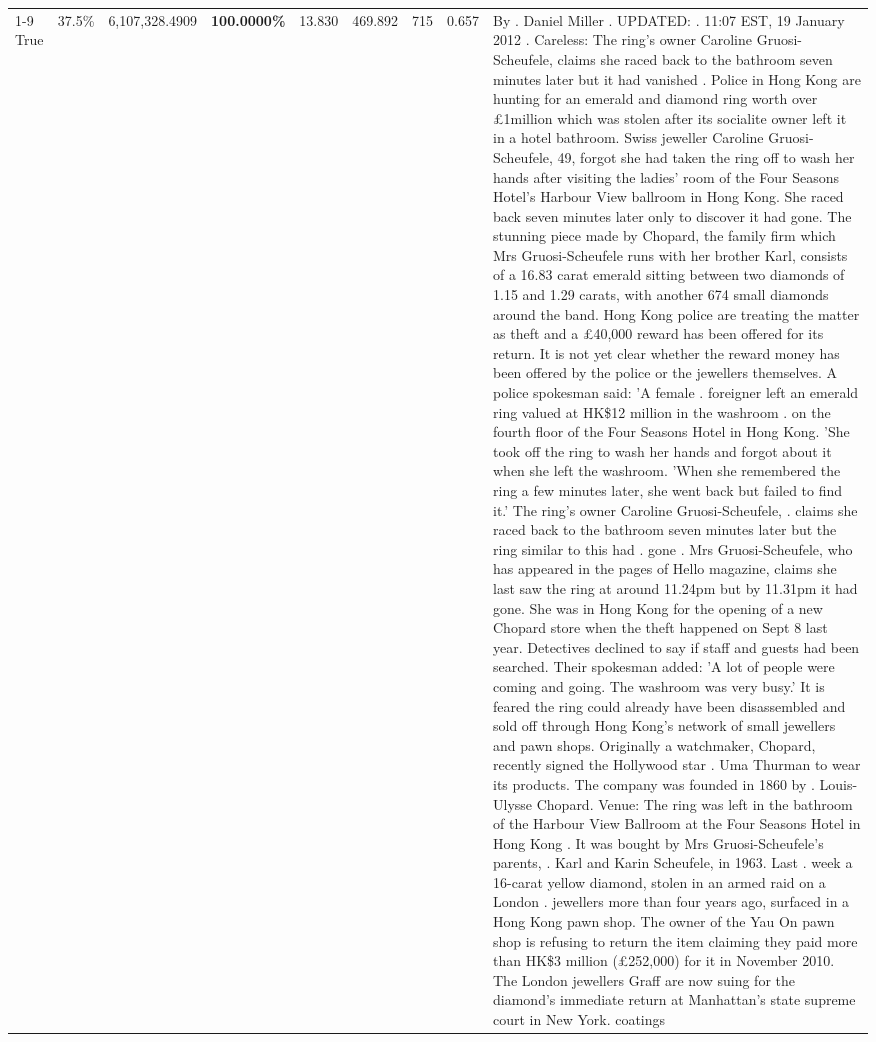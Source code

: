\begin{table}[H]
\begin{tabular}{lllrlllll}
\cline{1-9}
True & 37.5\% & 6,107,328.4909 & \bfseries \color{red} 100.0000\% & 13.830 & 469.892 & 715 & 0.657 & By . Daniel Miller . UPDATED: . 11:07 EST, 19 January 2012 . Careless: The ring's owner Caroline Gruosi-Scheufele, claims she raced back to the bathroom seven minutes later but it had vanished . Police in Hong Kong are hunting for an emerald and diamond ring worth over £1million which was stolen after its socialite owner left it in a hotel bathroom. Swiss jeweller Caroline Gruosi-Scheufele, 49, forgot she had taken the ring off to wash her hands after visiting the ladies' room of the Four Seasons Hotel's Harbour View ballroom in Hong Kong. She raced back seven minutes later only to discover it had gone. The stunning piece made by Chopard, the family firm which Mrs Gruosi-Scheufele runs with her brother Karl, consists of a 16.83 carat emerald sitting between two diamonds of 1.15 and 1.29 carats, with another 674 small diamonds around the band. Hong Kong police are treating the matter as theft and a £40,000 reward has been offered for its return. It is not yet clear whether the reward money has been offered by the police or the jewellers themselves. A police spokesman said: 'A female . foreigner left an emerald ring valued at HK\$12 million in the washroom . on the fourth floor of the Four Seasons Hotel in Hong Kong. 'She took off the ring to wash her hands and forgot about it when she left the washroom. 'When she remembered the ring a few minutes later, she went back but failed to find it.' The ring's owner Caroline Gruosi-Scheufele, . claims she raced back to the bathroom seven minutes later but the ring similar to this had . gone . Mrs Gruosi-Scheufele, who has appeared in the pages of Hello magazine, claims she last saw the ring at around 11.24pm but by 11.31pm it had gone. She was in Hong Kong for the opening of a new Chopard store when the theft happened on Sept 8 last year. Detectives declined to say if staff and guests had been searched. Their spokesman added: 'A lot of people were coming and going. The washroom was very busy.' It is feared the ring could already have been disassembled and sold off through Hong Kong's network of small jewellers and pawn shops. Originally a watchmaker, Chopard, recently signed the Hollywood star . Uma Thurman to wear its products. The company was founded in 1860 by . Louis-Ulysse Chopard. Venue: The ring was left in the bathroom of the Harbour View Ballroom at the Four Seasons Hotel in Hong Kong . It was bought by Mrs Gruosi-Scheufele's  parents, . Karl and Karin Scheufele, in 1963. Last . week a 16-carat yellow diamond, stolen in an armed raid on a London . jewellers more than four years ago, surfaced in a Hong Kong pawn shop. The owner of the Yau On pawn shop is refusing to return the item claiming they paid more than HK\$3 million (£252,000) for it in November 2010. The London jewellers Graff are now suing for the diamond’s immediate return at Manhattan’s state supreme court in New York. coatings \\

\end{tabular}
\end{table}
